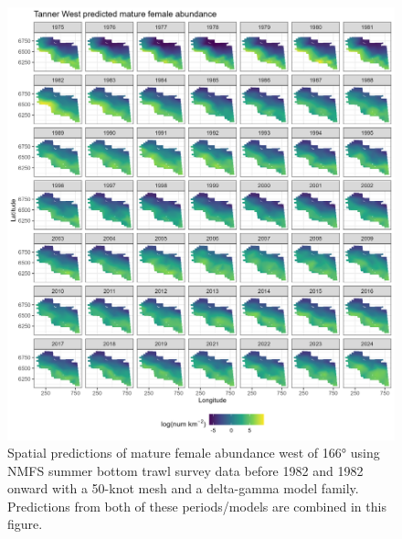 \documentclass[
]{article}
\begin{document}
\begin{figure}

{\centering \includegraphics[width=1\linewidth,height=1\textheight]{../BAIRDI/Figures/TannerW_matfem_spatabund} 

}

\caption{Spatial predictions of mature female abundance west of 166° using NMFS summer bottom trawl survey data before 1982 and 1982 onward with a 50-knot mesh and a delta-gamma model family. Predictions from both of these periods/models are combined in this figure.}\label{fig:spatpred-abund-50-matfemW}
\end{figure}
\end{document}
